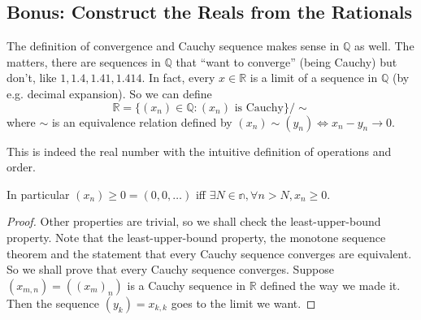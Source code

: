 \subsection{Bonus: Construct the Reals from the Rationals}
The definition of convergence and Cauchy sequence makes sense in $\mathbb Q$ as well.
The matters, there are sequences in $\mathbb Q$ that ``want to converge'' (being Cauchy) but don't, like $1,1.4,1.41,1.414$.
In fact, every $x\in\mathbb R$ is a limit of a sequence in $\mathbb Q$ (by e.g. decimal expansion).
So we can define
$$\mathbb R=\{(x_n)\in\mathbb Q: (x_n)\text{ is Cauchy}\}/\sim$$
where $\sim$ is an equivalence relation defined by $(x_n)\sim (y_n)\iff x_n-y_n\to 0$.
\begin{proposition}
    This is indeed the real number with the intuitive definition of operations and order.
\end{proposition}
In particular $(x_n)\ge0=(0,0,\ldots)$ iff $\exists N\in\mathbb n,\forall n>N,x_n\ge 0$.
\begin{proof}
    Other properties are trivial, so we shall check the least-upper-bound property.
    Note that the least-upper-bound property, the monotone sequence theorem and the statement that every Cauchy sequence converges are equivalent.
    So we shall prove that every Cauchy sequence converges.
    Suppose $(x_{m,n})=((x_m)_n)$ is a Cauchy sequence in $\mathbb R$ defined the way we made it.
    Then the sequence $(y_k)=x_{k,k}$ goes to the limit we want.
\end{proof}
